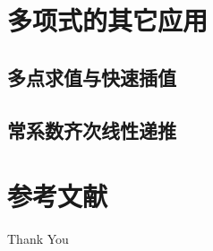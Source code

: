 \documentclass{beamer}
\begin{document}
\section{多项式的其它应用}

\subsection{多点求值与快速插值}

\subsection{常系数齐次线性递推}

\section{参考文献}

\begin{frame}[allowframebreaks]
    
    
    \nocite{*} %
\end{frame}


\begin{frame}
    \begin{center}
        {\Huge\calligra Thank You}
    \end{center}
\end{frame}
\end{document}
